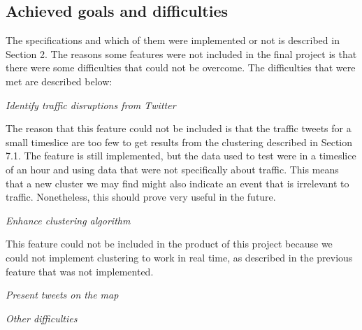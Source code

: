 \subsection{Achieved goals and difficulties}
The specifications and which of them were implemented or not is described in
Section 2. The reasons some features were not included in the final project is
that there were some difficulties that could not be overcome.
The difficulties that were met are described below:

\emph{Identify traffic disruptions from Twitter}

The reason that this feature could not be included is that the traffic tweets
for a small timeslice are too few to get results from the clustering described
in Section 7.1. The feature is still implemented, but the data used to test
were in a timeslice of an hour and using data that were not specifically about
traffic. This means that a new cluster we may find might also indicate an
event that is irrelevant to traffic. Nonetheless, this should prove very useful
in the future.

\emph{Enhance clustering algorithm}

This feature could not be included in the product of this project because we
could not implement clustering to work in real time, as described in the
previous feature that was not implemented.

\emph{Present tweets on the map}

\emph{Other difficulties}
